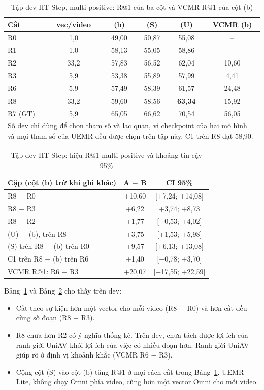 \documentclass{IEEEtran}
\begin{document}
\begin{table}[t]
\caption{Tập dev HT-Step, multi-positive: R@1 của ba cột và VCMR R@1 của cột (b)}
\label{tab:dev}
\setlength{\tabcolsep}{3pt}
\centering
\begin{tabular}{|l|c|c|c|c|c|}
\hline
Cắt & vec/video & (b) & (S) & (U) & VCMR (b) \\
\hline
R0 & 1,0 & 49,00 & 50,87 & 55,08 & -- \\
R1 & 1,0 & 58,13 & 55,05 & 58,86 & -- \\
R2 & 33,2 & 57,83 & 56,52 & 62,04 & 10,60 \\
R3 & 5,9 & 53,38 & 55,89 & 57,99 & 4,41 \\
R6 & 5,9 & 57,49 & 58,39 & 61,57 & 24,48 \\
R8 & 33,2 & 59,60 & 58,56 & \textbf{63,34} & 15,92 \\
\hline
R7 (GT) & 5,9 & 65,05 & 66,62 & 70,54 & 56,05 \\
\hline
\multicolumn{6}{p{225pt}}{Số dev chỉ dùng để chọn tham số và lạc quan, vì checkpoint của hai mô hình và mọi tham số của UEMR đều được chọn trên tập này. C1 trên R8 đạt 58,90.}
\end{tabular}
\end{table}

\begin{table}[t]
\caption{Tập dev HT-Step: hiệu R@1 multi-positive và khoảng tin cậy 95\%}
\label{tab:pairs}
\setlength{\tabcolsep}{3pt}
\centering
\begin{tabular}{|l|c|c|}
\hline
Cặp (cột (b) trừ khi ghi khác) & A $-$ B & CI 95\% \\
\hline
R8 $-$ R0 & +10,60 & [+7,24; +14,08] \\
R8 $-$ R3 & +6,22 & [+3,74; +8,73] \\
R8 $-$ R2 & +1,77 & [$-$0,53; +4,02] \\
(U) $-$ (b), trên R8 & +3,75 & [+1,53; +5,98] \\
(S) trên R8 $-$ (b) trên R0 & +9,57 & [+6,13; +13,08] \\
C1 trên R8 $-$ (b) trên R6 & +1,40 & [$-$0,78; +3,70] \\
VCMR R@1: R6 $-$ R3 & +20,07 & [+17,55; +22,59] \\
\hline
\end{tabular}
\end{table}

Bảng~\ref{tab:dev} và Bảng~\ref{tab:pairs} cho thấy trên dev:
\begin{itemize}
\item Cắt theo sự kiện hơn một vector cho mỗi video (R8 $-$ R0) và hơn cắt đều cùng số đoạn (R8 $-$ R3).
\item R8 chưa hơn R2 có ý nghĩa thống kê. Trên dev, chưa tách được lợi ích của ranh giới UniAV khỏi lợi ích của việc có nhiều đoạn hơn. Ranh giới UniAV giúp rõ ở định vị khoảnh khắc (VCMR R6 $-$ R3).
\item Cộng cột (S) vào cột (b) tăng R@1 ở mọi cách cắt trong Bảng~\ref{tab:dev}. UEMR-Lite, không chạy Omni phía video, cũng hơn một vector Omni cho mỗi video.
\end{itemize}
\end{document}
